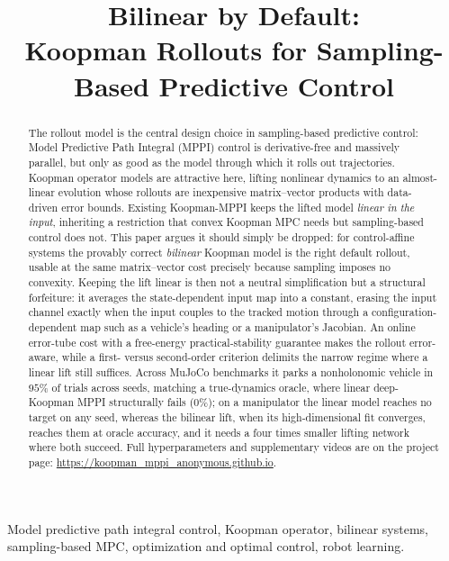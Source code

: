 \documentclass[lettersize,journal]{IEEEtran}
\theoremstyle{remark}
\begin{document}
\title{Bilinear by Default:\\
Koopman Rollouts for Sampling-Based Predictive Control}


\maketitle

\begin{abstract}
The rollout model is the central design choice in sampling-based predictive control: Model Predictive Path Integral (MPPI) control is derivative-free and massively parallel, but only as good as the model through which it rolls out trajectories.
Koopman operator models are attractive here, lifting nonlinear dynamics to an almost-linear evolution whose rollouts are inexpensive matrix--vector products with data-driven error bounds.
Existing Koopman-MPPI keeps the lifted model \emph{linear in the input}, inheriting a restriction that convex Koopman MPC needs but sampling-based control does not.
This paper argues it should simply be dropped: for control-affine systems the provably correct \emph{bilinear} Koopman model is the right default rollout, usable at the same matrix--vector cost precisely because sampling imposes no convexity.
Keeping the lift linear is then not a neutral simplification but a structural forfeiture: it averages the state-dependent input map into a constant, erasing the input channel exactly when the input couples to the tracked motion through a configuration-dependent map such as a vehicle's heading or a manipulator's Jacobian.
An online error-tube cost with a free-energy practical-stability guarantee makes the rollout error-aware, while a first- versus second-order criterion delimits the narrow regime where a linear lift still suffices.
Across MuJoCo benchmarks it parks a nonholonomic vehicle in $95\%$ of trials across seeds, matching a true-dynamics oracle, where linear deep-Koopman MPPI structurally fails ($0\%$); on a manipulator the linear model reaches no target on any seed, whereas the bilinear lift, when its high-dimensional fit converges, reaches them at oracle accuracy, and it needs a four times smaller lifting network where both succeed.
Full hyperparameters and supplementary videos are on the project page: \url{https://koopman_mppi_anonymous.github.io}.
\end{abstract}

\begin{IEEEkeywords}
Model predictive path integral control, Koopman operator, bilinear systems, sampling-based MPC, optimization and optimal control, robot learning.
\end{IEEEkeywords}
\end{document}
